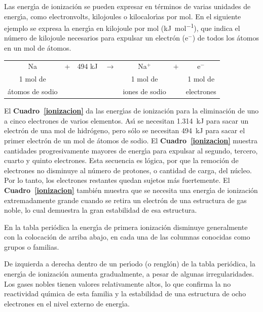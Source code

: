 Las energ\'{\i}a de ionizaci\'on se pueden expresar en t\'erminos de varias unidades de energ\'{\i}a, como electronvolts, kilojoules o kilocalor\'{\i}as por mol. En el siguiente ejemplo se expresa la energ\'{\i}a en kilojoule por mol (\si{\kilo\joule\per\mole}), que indica el n\'umero de kilojoule necesarios para expulsar un electr\'on (e$^-$) de todos los \'atomos en un mol de \'atomos.
\begin{center}
\begin{tabular}{ccccccc}
Na &+& 494 \si{\kilo\joule} & $\longrightarrow$ &Na$^+$ &$+$ &e$^-$\\
{\scriptsize 1 mol de}&&&&{\scriptsize  1 mol de}&&{\scriptsize 1 mol de}\\[-.1in]
{\scriptsize \'atomos de sodio} &&&&{\scriptsize iones de sodio} & &{\scriptsize 
electrones}\\ 
\end{tabular}
\end{center}

El \textbf{Cuadro~\ref{ionizacion}} da las energ\'{\i}as de ionizaci\'on para la eliminaci\'on de uno a cinco electrones de varios elementos. As\'{\i} se necesitan \SI{1,314}{\kilo\joule} para sacar un electr\'on de una mol de hidr\'ogeno, pero s\'olo se necesitan \SI{494}{\kilo\joule} para sacar el primer electr\'on de un mol de \'atomos de sodio. El \textbf{Cuadro~\ref{ionizacion}} muestra cantidades progresivamente mayores de energ\'{\i}a para expulsar al segundo, tercero, cuarto y quinto electrones. Esta secuencia es l\'ogica, por que la remoci\'on de electrones no disminuye al n\'umero de protones, o cantidad de carga, del n\'ucleo. Por lo tanto, los electrones restantes quedan sujetos m\'as fuertemente. El \textbf{Cuadro~\ref{ionizacion}} tambi\'en muestra que se necesita una energ\'{\i}a de ionizaci\'on extremadamente grande cuando se retira un electr\'on de una estructura de gas noble, lo cual demuestra la gran estabilidad de esa estructura.

En la tabla peri\'odica la energ\'{\i}a de primera ionizaci\'on disminuye generalmente con la colocaci\'on de arriba abajo, en cada una de las columnas conocidas como grupos  o familias.

De izquierda a derecha dentro de un per\'{\i}odo (o rengl\'on) de la tabla peri\'odica, la energ\'{\i}a de ionizaci\'on aumenta gradualmente, a pesar de algunas
irregularidades. Los gases nobles tienen valores relativamente altos, lo que confirma la no reactividad qu\'{\i}mica de esta familia y la estabilidad de una estructura de ocho electrones en el nivel externo de energ\'{\i}a.

